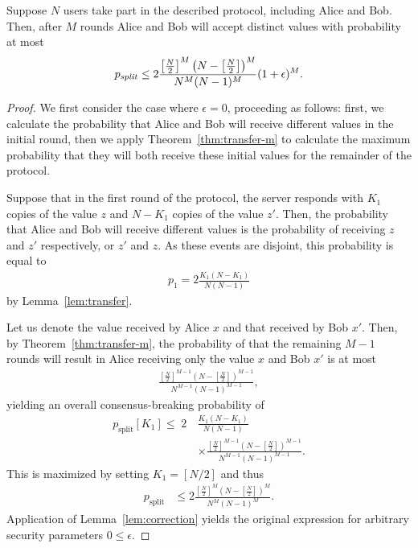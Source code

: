 \documentclass[USenglish]{llncs}
\begin{document}
\begin{theorem}\label{thm:pair-consensus}
Suppose $N$ users take part in the described protocol, including Alice and Bob.  Then,
after $M$ rounds Alice and Bob will accept distinct values with probability at most
\begin{align}
	p_\text{\emph{split}} \le 2\frac{\left[\frac{N}{2}\right]^M \left(N - \left[\frac{N}{2}\right]\right)^M}{N^M (N-1)^M}  (1+\epsilon)^M.
\end{align}
\begin{proof}
We first consider the case where $\epsilon = 0$,
proceeding as follows: first, we calculate the probability that Alice and Bob will
receive different values in the initial round, then we apply Theorem~\ref{thm:transfer-m}
to calculate the maximum probability that they will both receive these initial values for
the remainder of the protocol.

Suppose that in the first round of the protocol, the server responds with
$K_1$ copies of the value $z$ and $N-K_1$ copies of the value $z'$.  Then,
the probability that Alice and Bob will receive different values is the probability
of receiving $z$ and $z'$ respectively, or $z'$ and $z$.  As these events are
disjoint, this probability is equal to
\begin{align}
	p_1 = 2\frac{K_1(N-K_1)}{N(N-1)}
\end{align}
by Lemma~\ref{lem:transfer}.

Let us denote the value received by Alice $x$ and that received by Bob $x'$.  Then,
by Theorem~\ref{thm:transfer-m},
the probability of that the remaining $M-1$ rounds will result in Alice receiving only
the value $x$ and Bob $x'$ is at most
\begin{align}
	\frac{\left[\frac{N}{2}\right]^{M-1} \left(N - \left[\frac{N}{2}\right]\right)^{M-1}}{N^{M-1} (N-1)^{M-1}} ,
\end{align}
yielding an overall consensus-breaking probability of
\begin{align}
p_\text{split}[K_1] \le \;2\,&\frac{K_1(N-K_1)}{N(N-1)} \nonumber\\
	& \times \frac{\left[\frac{N}{2}\right]^{M-1} \left(N - \left[\frac{N}{2}\right]\right)^{M-1}}{N^{M-1} (N-1)^{M-1}} .
\end{align}
This is maximized by setting $K_1 = [N/2]$ and thus
\begin{align}
p_\text{split} &\le 2 \frac{\left[\frac{N}{2}\right]^M \left(N - \left[\frac{N}{2}\right]\right)^M}{N^M (N-1)^M} .
\end{align}
Application of Lemma~\ref{lem:correction} yields the original expression for
arbitrary security parameters $0 \le \epsilon$.
\end{proof}
\end{theorem}
\end{document}
